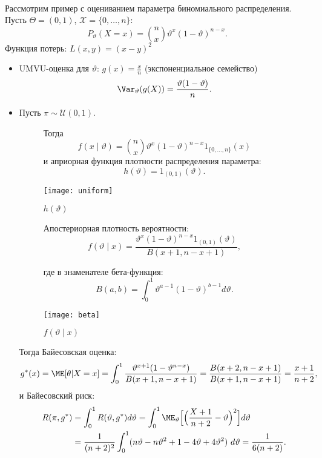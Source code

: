 \begin{exmp} \
	
	Рассмотрим пример с оцениванием параметра биномиального распределения. Пусть $\Theta = (0, 1)$, $\mathcal{X}=\{0, \dots , n\}$:
	\[P_\vartheta(X=x)=\binom{n}{x}\vartheta^x (1-\vartheta)^{n-x}.\]
	Функция потерь: $L(x,y)=(x-y)^2$
	\begin{itemize}
		\item UMVU-оценка для $\vartheta$: $g(x)=\frac{x}{n}$ (экспоненциальное семейство)
		\[\Var_{\vartheta}(g(X))=\frac{\vartheta(1-\vartheta)}{n}.\]
		\item Пусть $\pi \sim \mathcal{U}(0,1)$.
		
				\begin{figure}[!htb]\centering
					\begin{minipage}{0.7\textwidth} Тогда
						\[f(x \mid \vartheta) = \binom{n}{x}\vartheta^x (1-\vartheta)^{n-x} 1_{\{0, \dots , n\}}(x)\]
						и априорная функция плотности распределения параметра:
						\[h(\vartheta)=1_{(0,1)}(\vartheta).\]
					\end{minipage}
					\begin{minipage}{0.18\textwidth}
						\texttt{[image: uniform]}
						\captionsetup{labelformat=empty}
						\caption{$h(\vartheta)$}
					\end{minipage}
				\end{figure}
			
									
				\begin{figure}[!htb]\centering
					\begin{minipage}{0.7\textwidth}
						Апостериорная плотность вероятности:
						\[f(\vartheta \mid x) = \frac{\vartheta^x (1-\vartheta)^{n-x} 1_{(0,1)}(\vartheta)}{B(x+1, n-x+1)}, \]
						
						где в знаменателе бета-функция:
						\[B(a,b)=\int_{0}^{1} \vartheta^{a-1} (1-\vartheta)^{b-1} d \vartheta. \]
					\end{minipage}
					\begin{minipage}{0.18\textwidth}\centering
						\texttt{[image: beta]}
						\captionsetup{labelformat=empty}
						\caption{$f(\vartheta \mid x)$}
					\end{minipage}
				\end{figure}
			
			Тогда Байесовская оценка:
		\[g^*(x)=\ME[\theta|X=x]=\int_0^1 \frac{\vartheta^{x+1}(1-\vartheta^{n-x})}{B(x+1, n-x+1)}=\frac{B(x+2, n-x+1)}{B(x+1, n-x+1)} =\frac{x+1}{n+2},\]
		и Байесовский риск:
		\[
		\begin{aligned}
			R(\pi,g^*) & =\int_0^1 R(\vartheta, g^*) d\vartheta=\int_0^1 \ME_\vartheta\Big[\Big(\frac{X+1}{n+2}-\vartheta \Big)^2\Big]d\vartheta \\
			 & =\frac{1}{(n+2)^2} \int_0^1 (n\vartheta - n\vartheta^2+1-4\vartheta+4\vartheta^2)\ d\vartheta=\frac{1}{6(n+2)}.  
		\end{aligned}
		\]
	\end{itemize}
\end{exmp}


